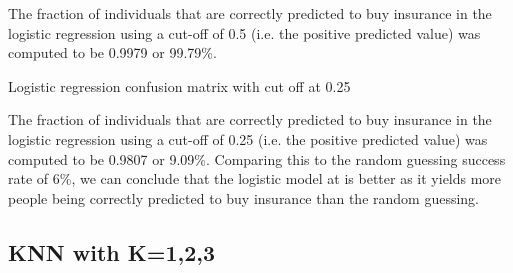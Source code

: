 \documentclass{article}
\begin{document}
The fraction of individuals that are correctly predicted to buy insurance in the logistic regression using a cut-off of 0.5 (i.e. the positive predicted value) was computed to be 0.9979 or 99.79\%. 

\newline

\begin{table}[!htb]
\caption{Logistic regression confusion matrix with cut off at 0.25}
\label{model1}
\begin{center}


\end{center}
\end{table}

The fraction of individuals that are correctly predicted to buy insurance in the logistic regression using a cut-off of 0.25 (i.e. the positive predicted value) was computed to be 0.9807 or 9.09\%. 
\newline
Comparing this to the random guessing success rate of 6\%, we can conclude that the logistic model at is better as it yields more people being correctly predicted to buy insurance than the random guessing.\\
\newline

\subsection{KNN with K=1,2,3}
\end{document}
